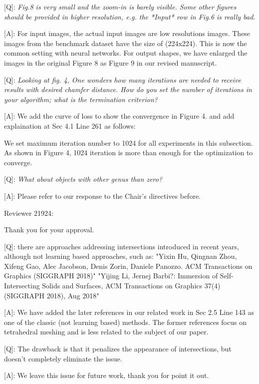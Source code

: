 \documentclass[10pt]{letter} %
\newcommand{\mdf}[1]{\textcolor[rgb]{1.00,0.00,1.00}{#1}}
\begin{document}
	[Q]: \emph{Fig.8 is very small and the zoom-in is barely visible.  Some other figures should be provided in higher resolution, e.g. the *Input* row in Fig.6 is really bad.} 
	
	[A]: For input images, the actual input images are low resolutions images. These images from the benchmark dataset have the size of (224x224). This is now the common setting with neural networks. For output shapes, we have enlarged the images in the original Figure 8 as Figure 9 in our revised manuscript.
	
	[Q]: \emph{Looking at fig. 4, One wonders how many iterations are needed to receive results with desired chamfer distance. How do you set the number of iterations in your algorithm; what is the termination criterion?}
	
	[A]: We add the curve of loss to show the convergence in Figure 4. and add explaination at Sec 4.1 Line 261 as follows:
	
	\mdf{We set maximum iteration number to 1024 for all experiments in this subsection. As shown in Figure 4, 1024 iteration is more than enough for the optimization to converge.}
	
	[Q]: \emph{What about objects with other genus than zero?}
	
	[A]: Please refer to our response to the Chair's directives before. 
	
	\hdashrule{\linewidth}{1pt}{1mm}
	Reviewer 21924:
	
	Thank you for your approval.
	
	[Q]: there are approaches addressing intersections introduced in recent years, although not learning based approaches, such as:
	"Yixin Hu, Qingnan Zhou, Xifeng Gao, Alec Jacobson, Denis Zorin, Daniele Panozzo. ACM Transactions on Graphics (SIGGRAPH 2018)"
	"Yijing Li, Jernej Barbi?: Immersion of Self-Intersecting Solids and Surfaces, ACM Transactions on Graphics 37(4) (SIGGRAPH 2018), Aug 2018"
	
	[A]: We have added the later references in our related work in Sec 2.5 Line 143 as one of the classic (not learning based) methods. The former references focus on tetrahedral meshing and is less related to the subject of our paper.
	
	[Q]: The drawback is that it penalizes the appearance of intersections, but doesn't completely eliminate the issue.
	
	[A]: We leave this issue for future work, thank you for point it out.
	
\end{document}
